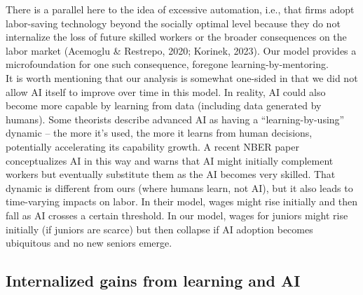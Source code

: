 \documentclass[12pt]{article}
\begin{document}
{\textcolor{green!60!black}{There is a parallel here to the idea of excessive automation, i.e., that firms adopt labor-saving technology beyond the socially optimal level because they do not internalize the loss of future skilled workers or the broader consequences on the labor market (Acemoglu \& Restrepo, 2020; Korinek, 2023). Our model provides a microfoundation for one such consequence, foregone learning-by-mentoring. \\
It is worth mentioning that our analysis is somewhat one-sided in that {we did not allow AI itself to improve} over time in this model. In reality, AI could also become more capable by learning from data (including data generated by humans). Some theorists describe advanced AI as having a ``learning-by-using'' dynamic -- the more it's used, the
more it learns from human decisions, potentially {accelerating} its capability growth. A recent NBER paper conceptualizes AI in this way and warns that AI might initially complement workers but eventually substitute them as the AI becomes very skilled. That dynamic is different from ours (where humans learn, not AI), but it also leads to
time-varying impacts on labor. In their model, wages might rise initially and then fall as AI crosses a certain threshold. In our model, wages for juniors might rise initially (if juniors are scarce) but then collapse if AI adoption becomes ubiquitous and no new seniors emerge.} 

\subsection{Internalized gains from learning and AI}

}
\end{document}
